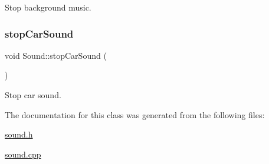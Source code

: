 Stop background music. 

\mbox{\label{class_sound_abd13dcd036641d8e53a9b9426bd5f6eb}} 
\subsubsection{\texorpdfstring{stopCarSound}{stopCarSound}}
{\footnotesize\ttfamily void Sound\+::stop\+Car\+Sound (\begin{DoxyParamCaption}{ }\end{DoxyParamCaption})\hspace{0.3cm}{\ttfamily [slot]}}



Stop car sound. 



The documentation for this class was generated from the following files\+:\begin{DoxyCompactItemize}
\item 
\mbox{\hyperlink{sound_8h}{sound.\+h}}\item 
\mbox{\hyperlink{sound_8cpp}{sound.\+cpp}}\end{DoxyCompactItemize}
